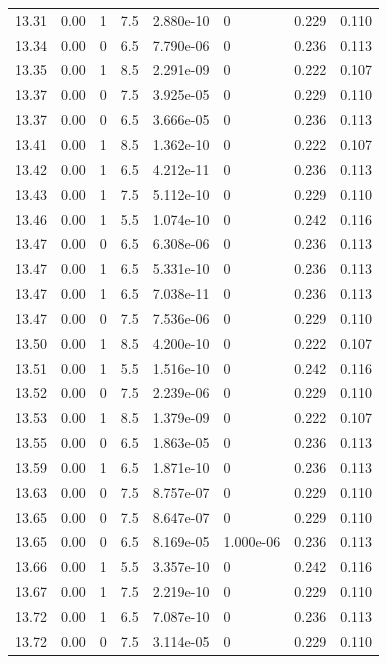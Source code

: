 \documentclass[preview]{standalone}
\begin{document}
{{{{{{{{{{{\begin{tabular}{L{1.2cm}C{1.2cm} C{0.3cm}C{0.5cm} C{1.4cm}C{1.4cm} C{1.4cm}C{1.4cm}}
  13.31  &  0.00  & 1     & 7.5 &  2.880e-10  & 0  & 0.229 &  0.110   \\ 
  13.34  &  0.00  & 0     & 6.5 &  7.790e-06  & 0  & 0.236 &  0.113   \\ 
  13.35  &  0.00  & 1     & 8.5 &  2.291e-09  & 0  & 0.222 &  0.107   \\ 
  13.37  &  0.00  & 0     & 7.5 &  3.925e-05  & 0  & 0.229 &  0.110   \\ 
  13.37  &  0.00  & 0     & 6.5 &  3.666e-05  & 0  & 0.236 &  0.113   \\ 
  13.41  &  0.00  & 1     & 8.5 &  1.362e-10  & 0  & 0.222 &  0.107   \\ 
  13.42  &  0.00  & 1     & 6.5 &  4.212e-11  & 0  & 0.236 &  0.113   \\ 
  13.43  &  0.00  & 1     & 7.5 &  5.112e-10  & 0  & 0.229 &  0.110   \\ 
  13.46  &  0.00  & 1     & 5.5 &  1.074e-10  & 0  & 0.242 &  0.116   \\ 
  13.47  &  0.00  & 0     & 6.5 &  6.308e-06  & 0  & 0.236 &  0.113   \\ 
  13.47  &  0.00  & 1     & 6.5 &  5.331e-10  & 0  & 0.236 &  0.113   \\ 
  13.47  &  0.00  & 1     & 6.5 &  7.038e-11  & 0  & 0.236 &  0.113   \\ 
  13.47  &  0.00  & 0     & 7.5 &  7.536e-06  & 0  & 0.229 &  0.110   \\ 
  13.50  &  0.00  & 1     & 8.5 &  4.200e-10  & 0  & 0.222 &  0.107   \\ 
  13.51  &  0.00  & 1     & 5.5 &  1.516e-10  & 0  & 0.242 &  0.116   \\ 
  13.52  &  0.00  & 0     & 7.5 &  2.239e-06  & 0  & 0.229 &  0.110   \\ 
  13.53  &  0.00  & 1     & 8.5 &  1.379e-09  & 0  & 0.222 &  0.107   \\ 
  13.55  &  0.00  & 0     & 6.5 &  1.863e-05  & 0  & 0.236 &  0.113   \\ 
  13.59  &  0.00  & 1     & 6.5 &  1.871e-10  & 0  & 0.236 &  0.113   \\ 
  13.63  &  0.00  & 0     & 7.5 &  8.757e-07  & 0  & 0.229 &  0.110   \\ 
  13.65  &  0.00  & 0     & 7.5 &  8.647e-07  & 0  & 0.229 &  0.110   \\ 
  13.65  &  0.00  & 0     & 6.5 &  8.169e-05  & 1.000e-06  & 0.236 &  0.113   \\ 
  13.66  &  0.00  & 1     & 5.5 &  3.357e-10  & 0  & 0.242 &  0.116   \\ 
  13.67  &  0.00  & 1     & 7.5 &  2.219e-10  & 0  & 0.229 &  0.110   \\ 
  13.72  &  0.00  & 1     & 6.5 &  7.087e-10  & 0  & 0.236 &  0.113   \\ 
  13.72  &  0.00  & 0     & 7.5 &  3.114e-05  & 0  & 0.229 &  0.110   \\ 
\hline 
\end{tabular} 

}}}}}}}}}}}
\end{document}
